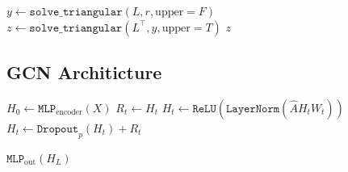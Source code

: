 %
%
%
%
%
%
%
%
%
%
%

%
%
%
%
%
%

\begin{algorithm}[H]
    \caption{Apply MPSSM-PCG Preconditioner}
    \label{alg:mpssm_pcg_preconditioner}
    \begin{algorithmic}[1]

        \State $y \gets \texttt{solve\_triangular}(L, r, \text{upper} = F)$ 
        \State $z \gets \texttt{solve\_triangular}(L^\top, y, \text{upper} = T)$
        \State \Return $z$
    \end{algorithmic}
\end{algorithm}

\subsection{GCN Architicture}
\begin{algorithm}[H]
    \caption{GCN For ECHO-SSSP}
    \label{alg:gcn}
    \begin{algorithmic}[1]
        \State $H_0 \gets \texttt{MLP}_{\text{encoder}}(X)$
        \State $R_t\gets H_t$
        \State $H_t \gets \texttt{ReLU}(\texttt{LayerNorm}(\hat AH_tW_t))$
        \State $H_t \gets \texttt{Dropout}_p(H_{t}) + R_t$
        \EndFor

        \State \Return $\texttt{MLP}_{\text{out}}(H_L)$
    \end{algorithmic}
\end{algorithm}

